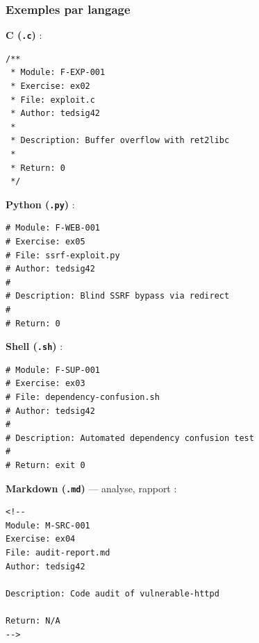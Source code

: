 \subsubsection*{Exemples par langage}

\textbf{C (\texttt{.c})} :
\begin{verbatim}
/**
 * Module: F-EXP-001
 * Exercise: ex02
 * File: exploit.c
 * Author: tedsig42
 *
 * Description: Buffer overflow with ret2libc
 *
 * Return: 0
 */
\end{verbatim}

\textbf{Python (\texttt{.py})} :
\begin{verbatim}
# Module: F-WEB-001
# Exercise: ex05
# File: ssrf-exploit.py
# Author: tedsig42
#
# Description: Blind SSRF bypass via redirect
#
# Return: 0
\end{verbatim}

\textbf{Shell (\texttt{.sh})} :
\begin{verbatim}
# Module: F-SUP-001
# Exercise: ex03
# File: dependency-confusion.sh
# Author: tedsig42
#
# Description: Automated dependency confusion test
#
# Return: exit 0
\end{verbatim}

\textbf{Markdown (\texttt{.md})} --- analyse, rapport :
\begin{Verbatim}[fontsize=\normalsize]
<!--
Module: M-SRC-001
Exercise: ex04
File: audit-report.md
Author: tedsig42

Description: Code audit of vulnerable-httpd

Return: N/A
-->
\end{Verbatim}
